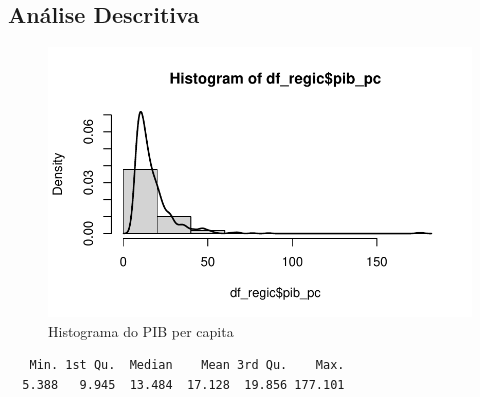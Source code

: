 \documentclass[a4paper,12pt]{article}
\newenvironment{Shaded}{\begin{snugshade}}{\end{snugshade}}
\newcommand{\AttributeTok}[1]{\textcolor[rgb]{0.00,0.34,0.68}{#1}}
\newcommand{\ConstantTok}[1]{\textcolor[rgb]{0.67,0.33,0.00}{#1}}
\newcommand{\DecValTok}[1]{\textcolor[rgb]{0.69,0.50,0.00}{#1}}
\newcommand{\DocumentationTok}[1]{\textcolor[rgb]{0.38,0.47,0.50}{#1}}
\newcommand{\FunctionTok}[1]{\textcolor[rgb]{0.39,0.29,0.61}{#1}}
\newcommand{\NormalTok}[1]{\textcolor[rgb]{0.12,0.11,0.11}{#1}}
\newcommand{\SpecialCharTok}[1]{\textcolor[rgb]{0.24,0.68,0.91}{#1}}
\begin{document}
\hypertarget{anuxe1lise-descritiva}{%
\subsection{Análise Descritiva}\label{anuxe1lise-descritiva}}

\begin{Shaded}
\end{Shaded}

\begin{figure}[H]

\caption{Histograma do PIB per capita}

{\centering \includegraphics{main_files/figure-pdf/unnamed-chunk-3-1.pdf}

}

\end{figure}

\begin{Shaded}
\end{Shaded}

\begin{verbatim}
   Min. 1st Qu.  Median    Mean 3rd Qu.    Max. 
  5.388   9.945  13.484  17.128  19.856 177.101 
\end{verbatim}
\end{document}
